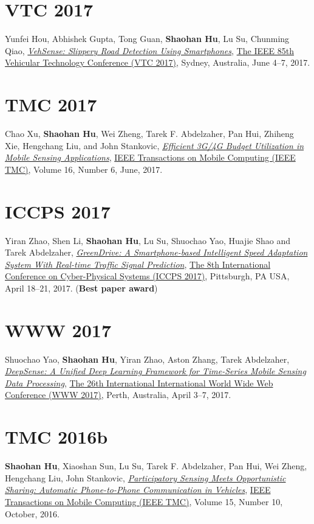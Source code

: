 \section{\sc VTC 2017}\hypertarget{hou2017vtc}{}
Yunfei Hou, Abhishek Gupta, Tong Guan, \textbf{Shaohan Hu}, Lu Su, Chunming Qiao,
\href{https://arxiv.org/abs/1705.03955}{\emph{VehSense: Slippery Road Detection Using Smartphones}},
\href{http://ieeevtc.org/vtc2017spring}{\textsf{The IEEE 85th Vehicular Technology Conference (VTC 2017)}},
Sydney, Australia, June 4--7, 2017.

\section{\sc TMC 2017}\hypertarget{xu2017tmc}{}
Chao Xu, \textbf{Shaohan Hu}, Wei Zheng, Tarek F. Abdelzaher, Pan Hui, Zhiheng Xie, Hengchang Liu, and John Stankovic,
\href{http://ieeexplore.ieee.org/document/7539667}{\emph{Efficient 3G/4G Budget Utilization in Mobile Sensing Applications}},
\href{http://www.computer.org/web/tmc}{\textsf{IEEE Transactions on Mobile Computing (IEEE TMC)}},
Volume 16, Number 6, June, 2017.

\section{\sc ICCPS 2017}\hypertarget{zhao2017iccps}{}
Yiran Zhao, Shen Li, \textbf{Shaohan Hu}, Lu Su, Shuochao Yao, Huajie Shao and Tarek Abdelzaher,
\href{http://dl.acm.org/citation.cfm?id=3055009}{\emph{GreenDrive: A Smartphone-based Intelligent Speed Adaptation System With Real-time Traffic Signal Prediction}},
\href{http://iccps2017.cse.wustl.edu}{\textsf{The 8th International Conference on Cyber-Physical Systems (ICCPS 2017)}},
Pittsburgh, PA USA, April 18--21, 2017. (\textbf{Best paper award})

\section{\sc WWW 2017}\hypertarget{yao2017www}{}
Shuochao Yao, \textbf{Shaohan Hu}, Yiran Zhao, Aston Zhang, Tarek Abdelzaher,
\href{http://dl.acm.org/citation.cfm?id=3052577}{\emph{DeepSense: A Unified Deep Learning Framework for Time-Series Mobile Sensing Data Processing}},
\href{http://www.www2017.com.au/}{\textsf{The 26th International International World Wide Web Conference (WWW 2017)}},
Perth, Australia, April 3--7, 2017.

\section{\sc TMC 2016b}\hypertarget{hu2015tmc}{}
\textbf{Shaohan Hu}, Xiaoshan Sun, Lu Su, Tarek F. Abdelzaher, Pan Hui, Wei Zheng, Hengchang Liu, John Stankovic,
\href{http://ieeexplore.ieee.org/document/7337442}{\emph{Participatory Sensing Meets Opportunistic Sharing: Automatic Phone-to-Phone Communication in Vehicles}},
\href{http://www.computer.org/web/tmc}{\textsf{IEEE Transactions on Mobile Computing (IEEE TMC)}},
Volume 15, Number 10, October, 2016.

